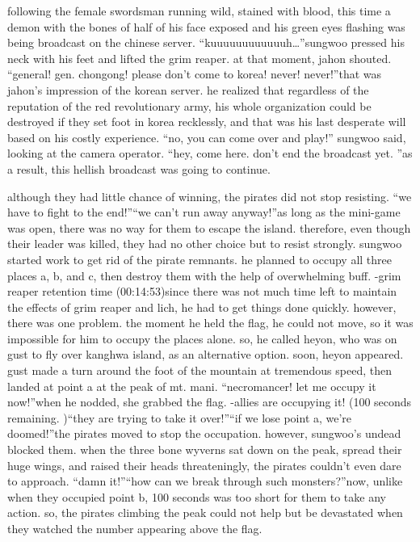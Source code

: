 following the female swordsman running wild, stained with blood, this time a demon with the bones of half of his face exposed and his green eyes flashing was being broadcast on the chinese server.
“kuuuuuuuuuuuuh…”sungwoo pressed his neck with his feet and lifted the grim reaper.
at that moment, jahon shouted.
“general! gen.
 chongong! please don’t come to korea! never! never!”that was jahon’s impression of the korean server.
 he realized that regardless of the reputation of the red revolutionary army, his whole organization could be destroyed if they set foot in korea recklessly, and that was his last desperate will based on his costly experience.
“no, you can come over and play!” sungwoo said, looking at the camera operator.
“hey, come here.
 don’t end the broadcast yet.
”as a result, this hellish broadcast was going to continue.


although they had little chance of winning, the pirates did not stop resisting.
“we have to fight to the end!”“we can’t run away anyway!”as long as the mini-game was open, there was no way for them to escape the island.
 therefore, even though their leader was killed, they had no other choice but to resist strongly.
sungwoo started work to get rid of the pirate remnants.
 he planned to occupy all three places a, b, and c, then destroy them with the help of overwhelming buff.
-grim reaper retention time (00:14:53)since there was not much time left to maintain the effects of grim reaper and lich, he had to get things done quickly.
however, there was one problem.
 the moment he held the flag, he could not move, so it was impossible for him to occupy the places alone.
so, he called heyon, who was on gust to fly over kanghwa island, as an alternative option.
soon, heyon appeared.
 gust made a turn around the foot of the mountain at tremendous speed, then landed at point a at the peak of mt.
 mani.
“necromancer! let me occupy it now!”when he nodded, she grabbed the flag.
-allies are occupying it! (100 seconds remaining.
)“they are trying to take it over!”“if we lose point a, we’re doomed!”the pirates moved to stop the occupation.
 however, sungwoo’s undead blocked them.
when the three bone wyverns sat down on the peak, spread their huge wings, and raised their heads threateningly, the pirates couldn’t even dare to approach.
“damn it!”“how can we break through such monsters?”now, unlike when they occupied point b, 100 seconds was too short for them to take any action.
 so, the pirates climbing the peak could not help but be devastated when they watched the number appearing above the flag.


 